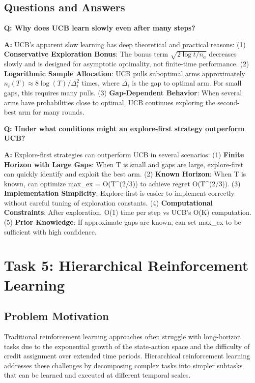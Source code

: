 \documentclass[12pt]{article}
\begin{document}
{{{\subsection{Questions and Answers}

\textbf{Q: Why does UCB learn slowly even after many steps?}

\textbf{A:} UCB's apparent slow learning has deep theoretical and practical reasons: (1) \textbf{Conservative Exploration Bonus}: The bonus term $\sqrt{2 \log t / n_a}$ decreases slowly and is designed for asymptotic optimality, not finite-time performance. (2) \textbf{Logarithmic Sample Allocation}: UCB pulls suboptimal arms approximately $n_i(T) \approx 8 \log(T) / \Delta_i^2$ times, where $\Delta_i$ is the gap to optimal arm. For small gaps, this requires many pulls. (3) \textbf{Gap-Dependent Behavior}: When several arms have probabilities close to optimal, UCB continues exploring the second-best arm for many rounds.

\textbf{Q: Under what conditions might an explore-first strategy outperform UCB?}

\textbf{A:} Explore-first strategies can outperform UCB in several scenarios: (1) \textbf{Finite Horizon with Large Gaps}: When T is small and gaps are large, explore-first can quickly identify and exploit the best arm. (2) \textbf{Known Horizon}: When T is known, can optimize max_ex = O(T^(2/3)) to achieve regret O(T^(2/3)). (3) \textbf{Implementation Simplicity}: Explore-first is easier to implement correctly without careful tuning of exploration constants. (4) \textbf{Computational Constraints}: After exploration, O(1) time per step vs UCB's O(K) computation. (5) \textbf{Prior Knowledge}: If approximate gaps are known, can set max_ex to be sufficient with high confidence.

\section{Task 5: Hierarchical Reinforcement Learning}

\subsection{Problem Motivation}

Traditional reinforcement learning approaches often struggle with long-horizon tasks due to the exponential growth of the state-action space and the difficulty of credit assignment over extended time periods. Hierarchical reinforcement learning addresses these challenges by decomposing complex tasks into simpler subtasks that can be learned and executed at different temporal scales.

}}}
\end{document}
